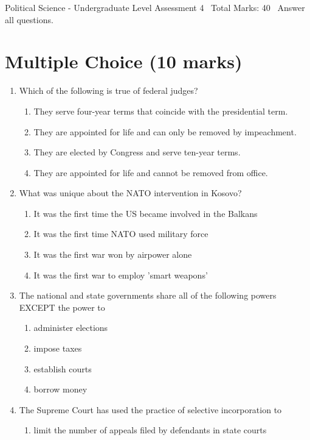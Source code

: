 \documentclass[12pt]{article}
\begin{document}
\begin{center}
Political Science - Undergraduate Level Assessment 4 \
Total Marks: 40 \
Answer all questions.
\end{center}

\section*{Multiple Choice (10 marks)}
\begin{enumerate}[label=\arabic*.]
\item Which of the following is true of federal judges?
\begin{enumerate}[label=(\alph*)]
    \item They serve four-year terms that coincide with the presidential term.
    \item They are appointed for life and can only be removed by impeachment.
    \item They are elected by Congress and serve ten-year terms.
    \item They are appointed for life and cannot be removed from office.
\end{enumerate}
\item What was unique about the NATO intervention in Kosovo?
\begin{enumerate}[label=(\alph*)]
    \item It was the first time the US became involved in the Balkans
    \item It was the first time NATO used military force
    \item It was the first war won by airpower alone
    \item It was the first war to employ 'smart weapons'
\end{enumerate}
\item The national and state governments share all of the following powers EXCEPT the power to
\begin{enumerate}[label=(\alph*)]
    \item administer elections
    \item impose taxes
    \item establish courts
    \item borrow money
\end{enumerate}
\item The Supreme Court has used the practice of selective incorporation to
\begin{enumerate}[label=(\alph*)]
    \item limit the number of appeals filed by defendants in state courts

\end{enumerate}
\end{enumerate}
\end{document}
